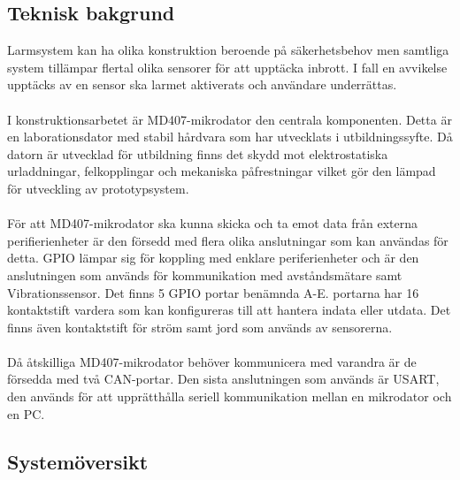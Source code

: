 \documentclass{article}
\begin{document}
\subsection{Teknisk bakgrund}
Larmsystem kan ha olika konstruktion beroende på säkerhetsbehov men samtliga system tillämpar flertal olika sensorer för att upptäcka inbrott. 
I fall en avvikelse upptäcks av en sensor ska larmet aktiverats och användare underrättas.
\\
\\
I konstruktionsarbetet är MD407-mikrodator den centrala komponenten. 
Detta är en laborationsdator med stabil hårdvara som har utvecklats i utbildningssyfte. 
Då datorn är utvecklad för utbildning finns det skydd mot elektrostatiska urladdningar, felkopplingar och mekaniska påfrestningar vilket gör den lämpad för utveckling av prototypsystem.
\\
\\
För att MD407-mikrodator ska kunna skicka och ta emot data från externa perifierienheter är den försedd med flera olika anslutningar som kan användas för detta. 
GPIO lämpar sig för koppling med enklare periferienheter och är den anslutningen som används för kommunikation med avståndsmätare samt Vibrationssensor. 
Det finns 5 GPIO portar benämnda A-E. portarna har 16 kontaktstift vardera som kan konfigureras till att hantera indata eller utdata. 
Det finns även kontaktstift för ström samt jord som används av sensorerna.
\\
\\
Då åtskilliga MD407-mikrodator behöver kommunicera med varandra är de försedda med två CAN-portar. Den sista anslutningen som används är USART, den används för att upprätthålla seriell kommunikation mellan en mikrodator och en PC.

\newpage
\subsection{Systemöversikt}
\end{document}
